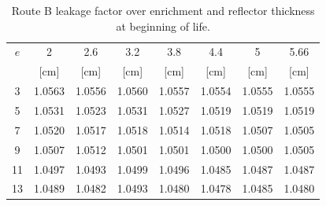 \begin{table}[htbp]
  \centering
  \small
  \caption[Leakage factor over enrichment and reflector thickness]{Route B leakage factor over enrichment and reflector thickness at beginning of life.}
  \label{tab:kt-enrich}
  \begin{tabular}{cccccccc}
    \toprule
    $e$ & 2 & 2.6 & 3.2 & 3.8 & 4.4 & 5 & 5.66 \\
    [wt\%] & [cm] & [cm] & [cm] & [cm] & [cm] & [cm] & [cm] \\
    \midrule
    3 & 1.0563 & 1.0556 & 1.0560 & 1.0557 & 1.0554 & 1.0555 & 1.0555 \\
    5 & 1.0531 & 1.0523 & 1.0531 & 1.0527 & 1.0519 & 1.0519 & 1.0519 \\
    7 & 1.0520 & 1.0517 & 1.0518 & 1.0514 & 1.0518 & 1.0507 & 1.0505 \\
    9 & 1.0507 & 1.0512 & 1.0501 & 1.0501 & 1.0500 & 1.0500 & 1.0505 \\
    11 & 1.0497 & 1.0493 & 1.0499 & 1.0496 & 1.0485 & 1.0487 & 1.0487 \\
    13 & 1.0489 & 1.0482 & 1.0493 & 1.0480 & 1.0478 & 1.0485 & 1.0480 \\
    \bottomrule
  \end{tabular}
\end{table}
